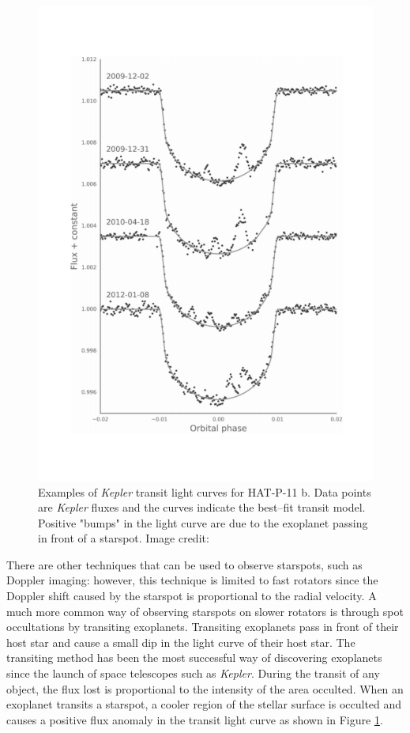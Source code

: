 \begin{figure}
    \centering
    \includegraphics[scale=0.4]{Figures/1-Introduction/hatp_11_spots.pdf}
    \caption[Light curves with examples of starspot "bumps" in exoplanet transits]{Examples of \textit{Kepler} transit light curves for HAT-P-11 b. Data points are \textit{Kepler} fluxes and the curves indicate the best--fit transit model. Positive "bumps" in the light curve are due to the exoplanet passing in front of a starspot. Image credit: \citet{Morris_etal_2017}}
    \label{fig:spot_occultation_example}
\end{figure}

There are other techniques that can be used to observe starspots, such as Doppler imaging: however, this technique is limited to fast rotators since the Doppler shift caused by the starspot is proportional to the radial velocity. A much more common way of observing starspots on slower rotators is through spot occultations by transiting exoplanets. Transiting exoplanets pass in front of their host star and cause a small dip in the light curve of their host star. The transiting method has been the most successful way of discovering exoplanets since the launch of space telescopes such as \textit{Kepler}. During the transit of any object, the flux lost is proportional to the intensity of the area occulted. When an exoplanet transits a starspot, a cooler region of the stellar surface is occulted and causes a positive flux anomaly in the transit light curve as shown in Figure \ref{fig:spot_occultation_example}.


